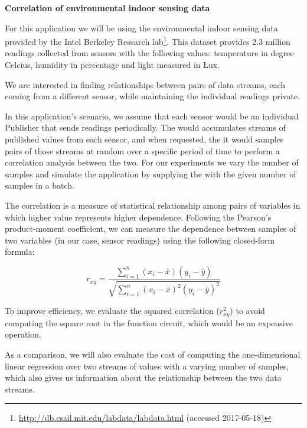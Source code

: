 \bigskip
\noindent\textbf{Correlation of environmental indoor sensing data}

For this application we will be using the environmental indoor sensing data
provided by the Intel Berkeley Research
lab\footnote{\url{http://db.csail.mit.edu/labdata/labdata.html} (accessed
2017-05-18)}.  This dataset provides 2.3 million readings collected
from sensors with the following values: temperature in degree Celcius, humidity
in percentage and light measured in Lux.

We are interested in finding relationships between pairs of data streams, each
coming from a different sensor, while maintaining the individual readings
private.

In this application's scenario, we assume that each sensor would be an
individual Publisher that sends readings periodically.  The \broker would
accumulates streams of published values from each sensor, and when requested,
the it would samples pairs of those streams at random over a specific period of
time to perform a correlation analysis between the two.  For our experiments we
vary the number of samples and simulate the application by supplying the \broker
with the given number of samples in a batch.

The correlation is a measure of statistical relationship among pairs of
variables in which higher value represents higher dependence.  Following the
Pearson's product-moment coefficient, we can measure the dependence between
samples of two variables (in our case, sensor readings) using the following
closed-form formula:

\[
r_{xy} = \frac{\displaystyle\sum_{i=1}^n (x_i - \bar{x}) (y_i - \bar{y})}
{\sqrt{\displaystyle\sum_{i=1}^n (x_i - \bar{x})^2 (y_i - \bar{y})^2}}
\]
\bigskip

To improve efficiency, we evaluate the squared correlation ($r_{xy}^2$) to avoid
computing the square root in the function circuit, which would be an expensive
operation.

As a comparison, we will also evaluate the cost of computing the
one-dimensional linear regression over two streams of values with a varying
number of samples, which also gives us information about the relationship
between the two data streams.

